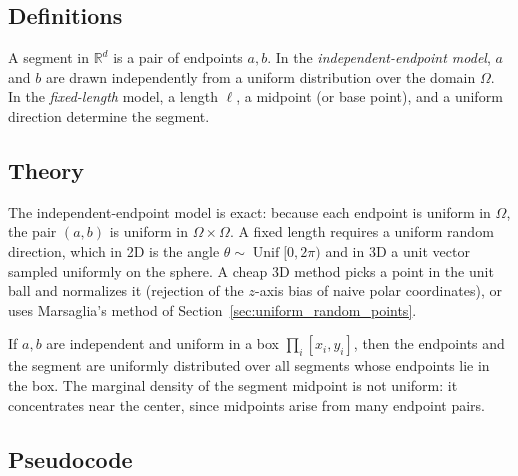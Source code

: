 \subsection{Definitions}
\begin{definition}\label{def:random_segment}
A segment in $\mathbb{R}^d$ is a pair of endpoints $a, b$. In the
\emph{independent-endpoint model}, $a$ and $b$ are drawn independently from a
uniform distribution over the domain $\Omega$. In the \emph{fixed-length}
model, a length $\ell$, a midpoint (or base point), and a uniform direction
determine the segment.
\end{definition}

\subsection{Theory}
The independent-endpoint model is exact: because each endpoint is uniform in
$\Omega$, the pair $(a, b)$ is uniform in $\Omega \times \Omega$. A fixed
length requires a uniform random direction, which in 2D is the angle
$\theta \sim \operatorname{Unif}[0, 2\pi)$ and in 3D a unit vector sampled
uniformly on the sphere. A cheap 3D method picks a point in the unit ball and
normalizes it (rejection of the $z$-axis bias of naive polar coordinates), or
uses Marsaglia's method of Section~\ref{sec:uniform_random_points}.

\begin{theorem}\label{thm:random_segment}
If $a, b$ are independent and uniform in a box $\prod_i [x_i, y_i]$, then the
endpoints and the segment are uniformly distributed over all segments whose
endpoints lie in the box. The marginal density of the segment midpoint is not
uniform: it concentrates near the center, since midpoints arise from many
endpoint pairs.
\end{theorem}

\subsection{Pseudocode}

